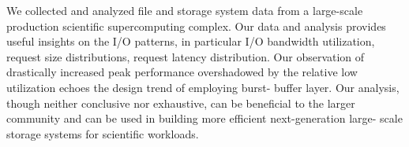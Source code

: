 
We collected and analyzed file and storage system data from a large-scale
production scientific supercomputing complex. Our data and analysis provides
useful insights on the I/O patterns, in particular I/O bandwidth utilization,
request size distributions, request latency distribution. Our observation of
drastically increased peak performance overshadowed by the relative low
utilization echoes the design trend of employing burst- buffer layer. Our
analysis, though neither conclusive nor exhaustive, can be beneficial to the
larger community and can be used in building more efficient next-generation
large- scale storage systems for scientific workloads.
